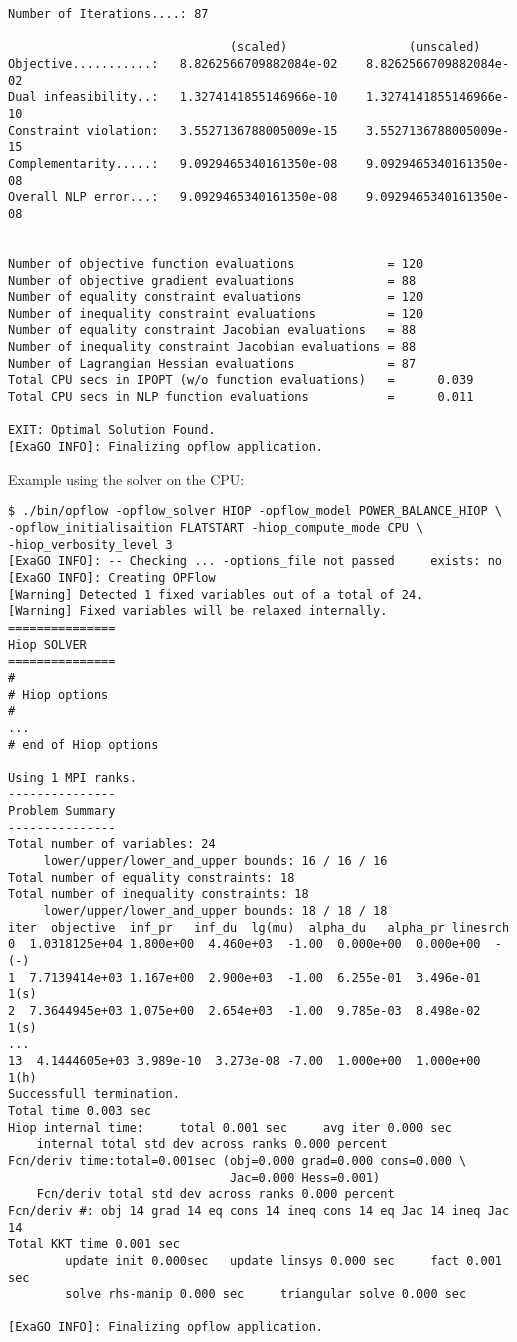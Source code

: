 \begin{lstlisting}
Number of Iterations....: 87

                               (scaled)                 (unscaled)
Objective...........:   8.8262566709882084e-02    8.8262566709882084e-02
Dual infeasibility..:   1.3274141855146966e-10    1.3274141855146966e-10
Constraint violation:   3.5527136788005009e-15    3.5527136788005009e-15
Complementarity.....:   9.0929465340161350e-08    9.0929465340161350e-08
Overall NLP error...:   9.0929465340161350e-08    9.0929465340161350e-08


Number of objective function evaluations             = 120
Number of objective gradient evaluations             = 88
Number of equality constraint evaluations            = 120
Number of inequality constraint evaluations          = 120
Number of equality constraint Jacobian evaluations   = 88
Number of inequality constraint Jacobian evaluations = 88
Number of Lagrangian Hessian evaluations             = 87
Total CPU secs in IPOPT (w/o function evaluations)   =      0.039
Total CPU secs in NLP function evaluations           =      0.011

EXIT: Optimal Solution Found.
[ExaGO INFO]: Finalizing opflow application.
\end{lstlisting}

Example using the \hiop solver on the CPU:

\begin{lstlisting}
$ ./bin/opflow -opflow_solver HIOP -opflow_model POWER_BALANCE_HIOP \
-opflow_initialisaition FLATSTART -hiop_compute_mode CPU \
-hiop_verbosity_level 3
[ExaGO INFO]: -- Checking ... -options_file not passed     exists: no
[ExaGO INFO]: Creating OPFlow
[Warning] Detected 1 fixed variables out of a total of 24.
[Warning] Fixed variables will be relaxed internally.
===============
Hiop SOLVER
===============
#
# Hiop options
#
...
# end of Hiop options

Using 1 MPI ranks.
---------------
Problem Summary
---------------
Total number of variables: 24
     lower/upper/lower_and_upper bounds: 16 / 16 / 16
Total number of equality constraints: 18
Total number of inequality constraints: 18
     lower/upper/lower_and_upper bounds: 18 / 18 / 18
iter  objective  inf_pr   inf_du  lg(mu)  alpha_du   alpha_pr linesrch
0  1.0318125e+04 1.800e+00  4.460e+03  -1.00  0.000e+00  0.000e+00  -(-)
1  7.7139414e+03 1.167e+00  2.900e+03  -1.00  6.255e-01  3.496e-01  1(s)
2  7.3644945e+03 1.075e+00  2.654e+03  -1.00  9.785e-03  8.498e-02  1(s)
...
13  4.1444605e+03 3.989e-10  3.273e-08 -7.00  1.000e+00  1.000e+00  1(h)
Successfull termination.
Total time 0.003 sec
Hiop internal time:     total 0.001 sec     avg iter 0.000 sec
    internal total std dev across ranks 0.000 percent
Fcn/deriv time:total=0.001sec (obj=0.000 grad=0.000 cons=0.000 \
                               Jac=0.000 Hess=0.001)
    Fcn/deriv total std dev across ranks 0.000 percent
Fcn/deriv #: obj 14 grad 14 eq cons 14 ineq cons 14 eq Jac 14 ineq Jac 14
Total KKT time 0.001 sec
        update init 0.000sec   update linsys 0.000 sec     fact 0.001 sec
        solve rhs-manip 0.000 sec     triangular solve 0.000 sec

[ExaGO INFO]: Finalizing opflow application.
\end{lstlisting}

